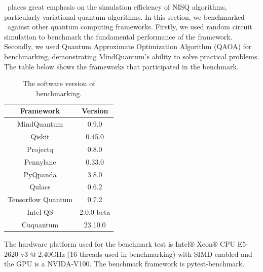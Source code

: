 \MindQuantum\ places great emphasis on the simulation efficiency of NISQ algorithms, particularly variational quantum algorithms. In this section, we benchmarked \MindQuantum\ against other quantum computing frameworks. Firstly, we used random circuit simulation to benchmark the fundamental performance of the framework. Secondly, we used Quantum Approximate Optimization Algorithm (QAOA) for benchmarking, demonstrating MindQuantum's ability to solve practical problems. The table below shows the frameworks that participated in the benchmark.

\begin{table}[ht]
    \begin{tabular}{cc}
        \toprule
        Framework          & Version    \\
        \midrule
        MindQuantum        & 0.9.0      \\
        Qiskit             & 0.45.0     \\
        Projectq           & 0.8.0      \\
        Pennylane          & 0.33.0     \\
        PyQpanda           & 3.8.0      \\
        Qulacs             & 0.6.2      \\
        Tensorflow Quantum & 0.7.2      \\
        Intel-QS           & 2.0.0-beta \\
        Cuquantum          & 23.10.0    \\
        \bottomrule
    \end{tabular}
    \caption{The software version of benchmarking.}
    \label{tab:software version}
\end{table}

The hardware platform used for the benchmark test is Intel® Xeon® CPU E5-2620 v3 @ 2.40GHz (16 threads used in benchmarking) with SIMD enabled and the GPU is a NVIDA-V100. The benchmark framework is pytest-benchmark.

